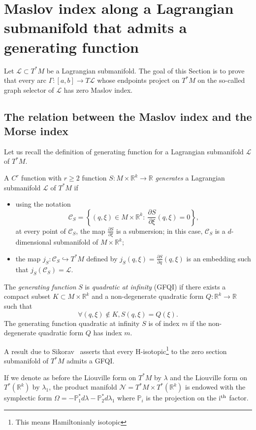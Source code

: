 \documentclass[AHL, Unicode, longabstracts, published]{cedram}
\newcommand*\cC{\mathcal{C}}
\newcommand*\cl{\mathcal{L}}
\newcommand*\cN{\mathcal{N}}
\newcommand*\R{\mathbb{R}}
\newcommand{\bbP}{\mathbb{P}}
\let\oldforall\forall
\renewcommand*{\forall}{\mathrel{\oldforall}}
\begin{document}
\section{Maslov index along a Lagrangian submanifold that admits a generating function}\label{section gfqi}
Let $\cl\subset T^*M$ be a Lagrangian submanifold. The goal of this Section is to prove that every arc $\Gamma:[a,b]\to T\cl$ whose endpoints project on $T^*M$ on the so-called graph selector of $\cl$ has zero Maslov index.
\subsection{The relation between the Maslov index and the Morse index} Let us recall the definition of generating function for a Lagrangian submanifold $\cl$ of $T^*M$.


\begin{defi}
A $C^r$ function with $r\geq 2$ function $S:M\times \R^k\rightarrow \R$ {\sl generates} a Lagrangian submanifold $\cl$ of $T^*M$ if
\begin{itemize}
\item using the notation
\[
\cC_S=\left\{ (q, \xi)\in M\times \R^k :\ \frac{\partial S}{\partial \xi}(q, \xi)=0\right\},
\]
at every point of $\cC_S$, the map $\frac{\partial S}{\partial \xi}$ is a submersion; in this case, $\cC_S$ is a $d$-dimensional submanifold of $M\times \R^k$;
\item the map $j_S: \cC_S\hookrightarrow T^*M$ defined by $j_S(q, \xi)=\frac{\partial S}{\partial q}(q, \xi)$ is an embedding such that $j_S(\cC_S)=\cl$.
\end{itemize}
The \emph{generating function} $S$ is \emph{quadratic at infinity} (GFQI) if there exists a compact subset $K\subset M\times \R^k$ and a non-degenerate quadratic form $Q:\R^k\rightarrow \R$ such that
\[
\forall (q, \xi)\notin K, S(q, \xi)=Q(\xi).
\]
The generating function quadratic at infinity $S$ is of index $m$ if the non-degenerate quadratic form $Q$ has index $m$.
\end{defi}

A result due to Sikorav~\cite{Bru1991,Sik1987} asserts that every H-isotopic\footnote{This means Hamiltonianly isotopic} to the zero section submanifold of $T^*M$ admits a GFQI.

\begin{nota}
If we denote as before the Liouville form on $T^*M$ by $\lambda$ and the Liouville form on $T^*(\R^k)$ by $\lambda_1$, the product manifold $\cN=T^*M\times T^*(\R^k)$ is endowed with the symplectic form
$\Omega=-\bbP_1^*d\lambda-\bbP_2^*d\lambda_1$ where $\bbP_i$ is the projection on the i$^{\rm th}$ factor.
\end{nota}
\end{document}
